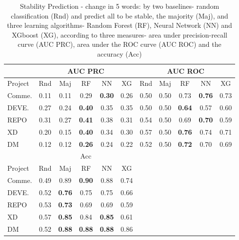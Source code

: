 \begin{table}[h]
	\centering
	\caption{Stability Prediction - change in 5 words: 
	by two baselines- random classification (Rnd) and predict all to be stable, the majority (Maj), and three learning algorithms- Random Forest (RF), Neural Network (NN) and XGboost (XG), according to three measures- area under precision-recall curve (AUC PRC), area under the ROC curve (AUC ROC) and the accuracy (Acc)}	
            
    \begin{tabular}{|l|c|c|c|c|c|c|c|c|c|c|}
	 \hline
    {} &  \multicolumn{5}{|c|}{AUC PRC} & \multicolumn{5}{|c|}{AUC ROC}  \\
    \hline
	Project	&      Rnd &  Maj &  RF  &  NN  &  XG  & Rnd  & Maj &  RF  &  NN  &  XG  \\
	\hline
	Comme.	&  0.11 & 0.11 & 0.29 & \textbf{0.30} & 0.26 & 0.50 & 0.50 & 0.73 & \textbf{0.76} & 0.73  \\
	DEVE.	&  0.27 & 0.24 & \textbf{0.40} & 0.35 & 0.35 & 0.50 & 0.50 & \textbf{0.64} & 0.57 & 0.60  \\
	REPO	    &  0.31 & 0.27 & \textbf{0.41} & 0.38 & 0.31 & 0.54 & 0.50 & 0.69 & \textbf{0.70} & 0.59  \\
	XD	        &  0.20 & 0.15 & \textbf{0.40} & 0.34 & 0.30 & 0.57 & 0.50 & \textbf{0.76} & 0.74 & 0.71 \\
	DM	        &  0.12 & 0.12 & \textbf{0.26} & 0.24 & 0.22 & 0.52 & 0.50 & \textbf{0.72} & 0.70 & 0.69  \\
	
	\hline \hline
	{} &  \multicolumn{5}{|c|}{Acc}\\
	
	\cmidrule{1-6}
	Project	    &   Rnd & Maj &  RF  &  NN  & XG \\
	\cmidrule{1-6}
	Comme.	& 0.49 & 0.89 & \textbf{0.90} & 0.88 & 0.74 \\
	DEVE.	& 0.52 & \textbf{0.76} & 0.75 & 0.75 & 0.66 \\
	REPO	    & 0.53 & \textbf{0.73} & 0.69 & 0.69 & 0.59 \\
	XD	        & 0.57 & \textbf{0.85} & 0.84 & \textbf{0.85} & 0.61 \\
	DM	        & 0.52 & \textbf{0.88} & \textbf{0.88} & \textbf{0.88} & 0.86 \\
	\cmidrule{1-6}
    \end{tabular}
    \label{Table:prediction results 5}
\end{table}


